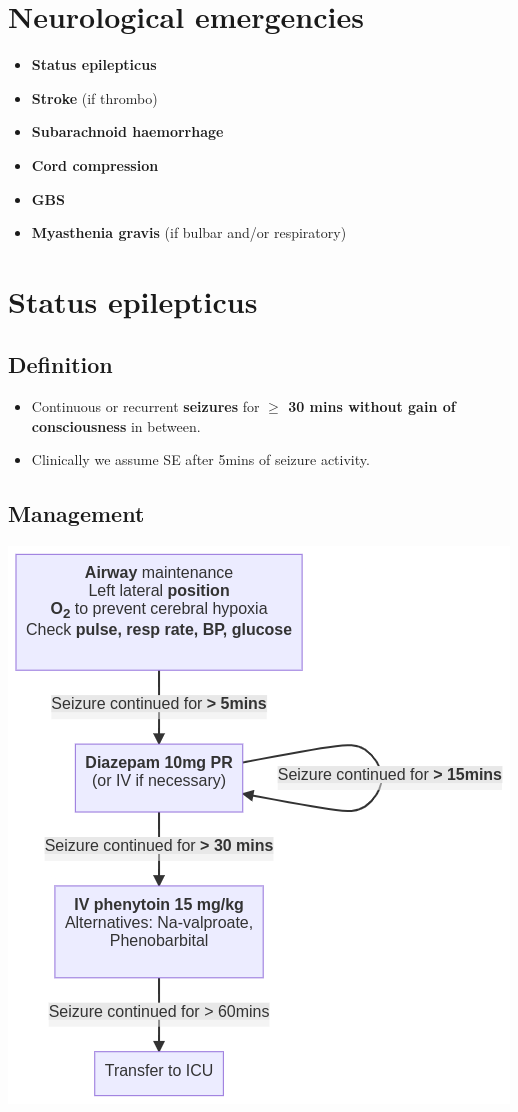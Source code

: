 \documentclass[
  12pt,
]{memoir}
\providecommand{\tightlist}{%
  \setlength{\itemsep}{0pt}\setlength{\parskip}{0pt}}
\begin{document}
\hypertarget{neurological-emergencies}{%
\section{Neurological emergencies}\label{neurological-emergencies}}

\begin{itemize}
\tightlist
\item
  \textbf{Status epilepticus}
\item
  \textbf{Stroke} (if thrombo)
\item
  \textbf{Subarachnoid haemorrhage}
\item
  \textbf{Cord compression}
\item
  \textbf{GBS}
\item
  \textbf{Myasthenia gravis} (if bulbar and/or respiratory)
\end{itemize}

\pagebreak

\hypertarget{status-epilepticus}{%
\section{Status epilepticus}\label{status-epilepticus}}

\hypertarget{definition-1}{%
\subsection{Definition}\label{definition-1}}

\begin{itemize}
\tightlist
\item
  Continuous or recurrent \textbf{seizures} for \textbf{\(\ge\) 30 mins
  without gain of consciousness} in between.
\item
  Clinically we assume SE after 5mins of seizure activity.
\end{itemize}

\hypertarget{management-2}{%
\subsection{Management}\label{management-2}}

\includegraphics[width=.7\textwidth]{../assets/med/stat-epi.png}
\end{document}
